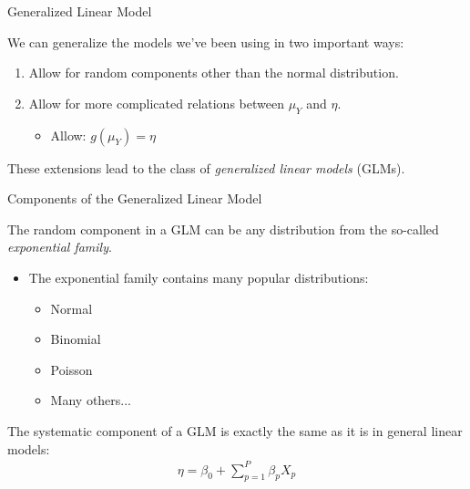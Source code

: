 \documentclass{beamer}\usepackage[]{graphicx}\usepackage[]{color}
\begin{document}
\begin{frame}{Generalized Linear Model}
  
  We can generalize the models we've been using in two important ways:
  \vc
  \begin{enumerate}
  \item Allow for random components other than the normal distribution.
    \vc
  \item Allow for more complicated relations between $\mu_Y$ and $\eta$.
    \begin{itemize}
    \item Allow: $g(\mu_Y) = \eta$
    \end{itemize}
  \end{enumerate}
  \vc
  These extensions lead to the class of \emph{generalized linear models} (GLMs).
  
\end{frame}


\begin{frame}{Components of the Generalized Linear Model}
  
  The random component in a GLM can be any distribution from the so-called 
  \emph{exponential family}.
  \vc
  \begin{itemize}
  \item The exponential family contains many popular distributions:
    \vc
    \begin{itemize}
    \item Normal
    \item Binomial
    \item Poisson
    \item Many others...
    \end{itemize}
  \end{itemize}
  \vc
  The systematic component of a GLM is exactly the same as it is in general 
  linear models:
  \begin{align*}
    \eta = \beta_0 + \sum_{p = 1}^P \beta_p X_p
  \end{align*}
  
\end{frame}

\end{document}
